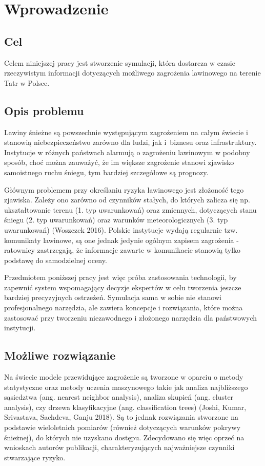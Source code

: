 \chapter{Wprowadzenie}
\label{cha:wprowadzenie}

\section{Cel}
Celem niniejszej pracy jest stworzenie symulacji, która dostarcza w czasie rzeczywistym informacji dotyczących możliwego zagrożenia lawinowego na terenie Tatr w Polsce. 


\section{Opis problemu}

Lawiny śnieżne są powszechnie występującym zagrożeniem na całym świecie i stanowią niebezpieczeństwo zarówno dla ludzi, jak i~biznesu oraz infrastruktury. Instytucje w różnych państwach alarmują o zagrożeniu lawinowym w podobny sposób, choć można zauważyć, że im większe zagrożenie stanowi zjawisko samoistnego ruchu śniegu, tym bardziej szczegółowe są prognozy. 

Głównym problemem przy określaniu ryzyka lawinowego jest złożoność tego zjawiska. Zależy ono zarówno od czynników stałych, do których zalicza się np. ukształtowanie terenu (1. typ uwarunkowań) oraz zmiennych, dotyczących stanu śniegu (2. typ uwarunkowań) oraz warunków meteorologicznych (3. typ uwarunkowań) (Woszczek 2016). Polskie instytucje wydają regularnie tzw. komunikaty lawinowe, są one jednak jedynie ogólnym zapisem zagrożenia - ratownicy zastrzegają, że informacje zawarte w komunikacie stanowią tylko podstawę do samodzielnej oceny. 

Przedmiotem poniższej pracy jest więc próba zastosowania technologii, by zapewnić system wspomagający decyzje ekspertów w celu tworzenia jeszcze bardziej precyzyjnych ostrzeżeń. Symulacja sama w sobie nie stanowi profesjonalnego narzędzia, ale zawiera koncepcje i rozwiązania, które można zastosować przy tworzeniu niezawodnego i złożonego narzędzia dla państwowych instytucji. 

\section{Możliwe rozwiązanie}
Na świecie modele przewidujące zagrożenie są tworzone w oparciu o metody statystyczne oraz metody uczenia maszynowego takie jak analiza najbliższego sąsiedztwa (ang. nearest neighbor analysis), analiza skupień (ang. cluster analysis), czy drzewa klasyfikacyjne (ang. classification trees) (Joshi, Kumar, Srivastava, Sachdeva, Ganju 2018). Są to jednak rozwiązania stworzone na podstawie wieloletnich pomiarów (również dotyczących warunków pokrywy śnieżnej), do których nie uzyskano dostępu. Zdecydowano się więc oprzeć na wnioskach autorów publikacji, charakteryzujących najważniejsze czynniki stwarzające ryzyko. 
 
